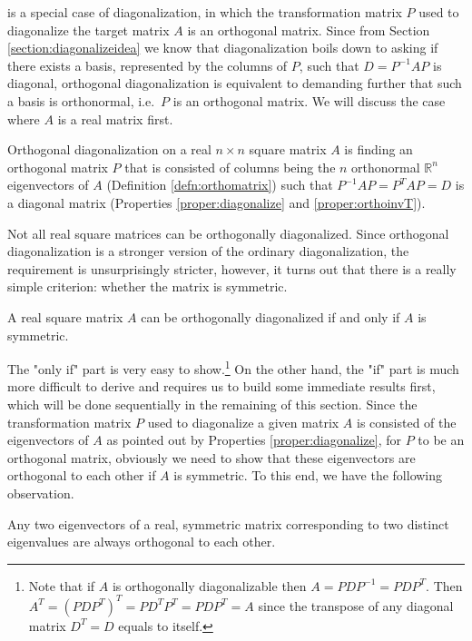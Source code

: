  is a special case of diagonalization, in which the transformation matrix $P$ used to diagonalize the target matrix $A$ is an orthogonal matrix. Since from Section \ref{section:diagonalizeidea} we know that diagonalization boils down to asking if there exists a basis, represented by the columns of $P$, such that $D = P^{-1}AP$ is diagonal, orthogonal diagonalization is equivalent to demanding further that such a basis is orthonormal, i.e.\ $P$ is an orthogonal matrix. We will discuss the case where $A$ is a real matrix first.
\begin{defn}
\label{defn:orthodiagonal}
Orthogonal diagonalization on a real $n \times n$ square matrix $A$ is finding an orthogonal matrix $P$ that is consisted of columns being the $n$ orthonormal $\mathbb{R}^n$ eigenvectors of $A$ (Definition \ref{defn:orthomatrix}) such that $P^{-1}AP = P^TAP = D$ is a diagonal matrix (Properties \ref{proper:diagonalize} and \ref{proper:orthoinvT}).
\end{defn}
Not all real square matrices can be orthogonally diagonalized. Since orthogonal diagonalization is a stronger version of the ordinary diagonalization, the requirement is unsurprisingly stricter, however, it turns out that there is a really simple criterion: whether the matrix is symmetric.
\begin{thm}
\label{thm:symdiag}
A real square matrix $A$ can be orthogonally diagonalized if and only if $A$ is symmetric.
\end{thm}
The "only if" part is very easy to show.\footnote{Note that if $A$ is orthogonally diagonalizable then $A = PDP^{-1} = PDP^T$. Then $A^T = (PDP^T)^T = PD^TP^T = PDP^T = A$ since the transpose of any diagonal matrix $D^T = D$ equals to itself.} On the other hand, the "if" part is much more difficult to derive and requires us to build some immediate results first, which will be done sequentially in the remaining of this section. Since the transformation matrix $P$ used to diagonalize a given matrix $A$ is consisted of the eigenvectors of $A$ as pointed out by Properties \ref{proper:diagonalize}, for $P$ to be an orthogonal matrix, obviously we need to show that these eigenvectors are orthogonal to each other if $A$ is symmetric. To this end, we have the following observation.
\begin{proper}
\label{proper:symortho}
Any two eigenvectors of a real, symmetric matrix corresponding to two distinct eigenvalues are always orthogonal to each other.
\end{proper}
